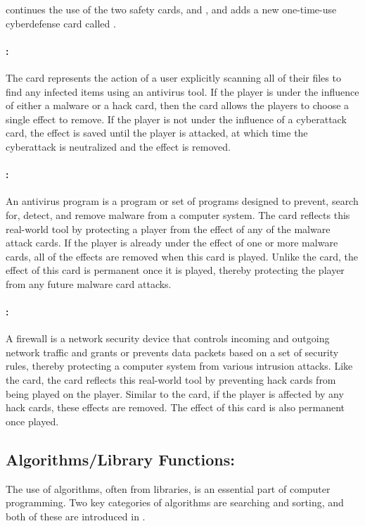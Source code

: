 \pwTwo continues the use of the two safety cards, \Anti and \Firens, and adds a new one-time-use cyberdefense card called \Scanns. 

\paragraph{\Scanns:}
The \Scan card represents the action of a user explicitly scanning all of their files to find any infected items using an antivirus tool. If the player is under the influence of either a malware or a hack card, then the \Scan card allows the players to choose a single effect to remove. If the player is not under the influence of a cyberattack card, the effect is saved until the player is attacked, at which time the cyberattack is neutralized and the \Scan effect is removed.

\paragraph{\Antins:}
An antivirus program is a program or set of programs designed to prevent, search for, detect, and remove malware from a computer system. The \Anti card reflects this real-world tool by protecting a player from the effect of any of the malware attack cards. If the player is already under the effect of one or more malware cards, all of the effects are removed when this card is played. Unlike the \Scan card, the effect of this card is permanent once it is played, thereby protecting the player from any future malware card attacks. 

\paragraph{\Firens:}
A firewall is a network security device that controls incoming and outgoing network traffic and grants or prevents data packets based on a set of security rules, thereby protecting a computer system from various intrusion attacks. Like the \Anti card, the \Fire card reflects this real-world tool by preventing hack cards from being played on the player. Similar to the \Anti card, if the player is affected by any hack cards, these effects are removed. The effect of this card is also permanent once played.

\subsection{Algorithms/Library Functions:}
The use of algorithms, often from libraries, is an essential part of computer programming. Two key categories of algorithms are searching and sorting, and both of these are introduced in \pwTwoNS.

